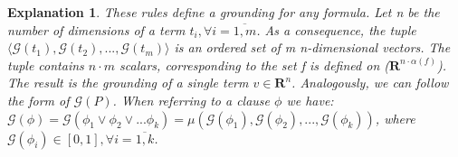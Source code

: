 \documentclass{article}
\newtheorem{explanado}{Explanation}[section]
\begin{document}
\begin{explanado}
These rules define a grounding for any formula. Let n be the number of dimensions of a term $t_i, \forall i = \overline{1,  m}$. As a consequence, the tuple $ \langle \mathcal{G}(t_1), \mathcal{G}(t_2), ..., \mathcal{G}(t_m) \rangle$ is an ordered set of m n-dimensional vectors. The tuple contains $n \cdot m$ scalars, corresponding to the set f is defined on ($\mathbf{R}^{n \cdot \alpha(f)}$). The result is the grounding of a single term $v \in \mathbf{R}^n$. Analogously, we can follow the form of $\mathcal{G}(P)$. When referring to a clause $\phi$ we have: $\mathcal{G}(\phi) = \mathcal{G}(\phi_1 \vee \phi_2 \vee ... \phi_k) = \mu(\mathcal{G}(\phi_1), \mathcal{G}(\phi_2), ..., \mathcal{G}(\phi_k))$, where $\mathcal{G}(\phi_i) \in [0, 1], \forall i = \overline{1, k}$. \cite{LTN} 
\end{explanado}
\end{document}
